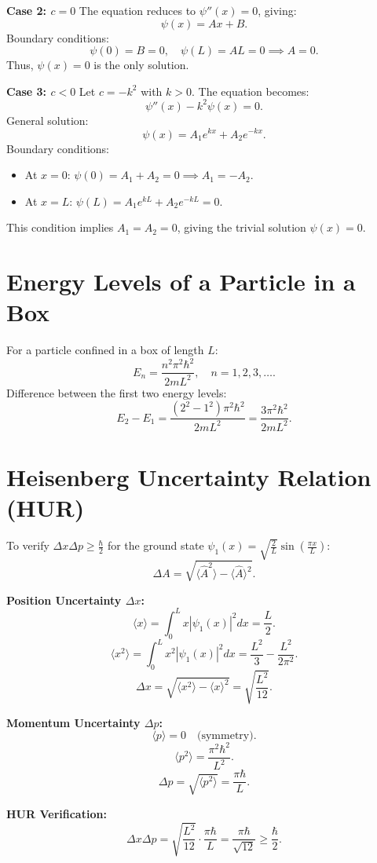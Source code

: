 \documentclass[a4paper,12pt]{article}
\begin{document}
\begin{multicols}{2}
\textbf{Case 2: $c = 0$}  
The equation reduces to $\psi''(x) = 0$, giving:
\[
\psi(x) = Ax + B.
\]
Boundary conditions:
\[
\psi(0) = B = 0, \quad \psi(L) = A L = 0 \implies A = 0.
\]
Thus, $\psi(x) = 0$ is the only solution.

\textbf{Case 3: $c < 0$}  
Let $c = -k^2$ with $k > 0$. The equation becomes:
\[
\psi''(x) - k^2\psi(x) = 0.
\]
General solution:
\[
\psi(x) = A_1e^{kx} + A_2e^{-kx}.
\]
Boundary conditions:
\begin{itemize}
    \item At $x=0$: $\psi(0) = A_1 + A_2 = 0 \implies A_1 = -A_2$.
    \item At $x=L$: $\psi(L) = A_1e^{kL} + A_2e^{-kL} = 0$.
\end{itemize}
This condition implies $A_1 = A_2 = 0$, giving the trivial solution $\psi(x) = 0$.

\section*{Energy Levels of a Particle in a Box}
For a particle confined in a box of length $L$:
\[
E_n = \frac{n^2\pi^2\hbar^2}{2mL^2}, \quad n = 1, 2, 3, \dots.
\]
Difference between the first two energy levels:
\[
E_2 - E_1 = \frac{(2^2 - 1^2)\pi^2\hbar^2}{2mL^2} = \frac{3\pi^2\hbar^2}{2mL^2}.
\]

\section*{Heisenberg Uncertainty Relation (HUR)}
To verify $\Delta x \Delta p \geq \frac{\hbar}{2}$ for the ground state $\psi_1(x) = \sqrt{\frac{2}{L}} \sin\left(\frac{\pi x}{L}\right)$:
\[
\Delta A = \sqrt{\langle \hat{A}^2 \rangle - \langle \hat{A} \rangle^2}.
\]

\textbf{Position Uncertainty $\Delta x$:}
\[
\langle x \rangle = \int_0^L x |\psi_1(x)|^2 dx = \frac{L}{2}.
\]
\[
\langle x^2 \rangle = \int_0^L x^2 |\psi_1(x)|^2 dx = \frac{L^2}{3} - \frac{L^2}{2\pi^2}.
\]
\[
\Delta x = \sqrt{\langle x^2 \rangle - \langle x \rangle^2} = \sqrt{\frac{L^2}{12}}.
\]

\textbf{Momentum Uncertainty $\Delta p$:}
\[
\langle p \rangle = 0 \quad \text{(symmetry)}.
\]
\[
\langle p^2 \rangle = \frac{\pi^2\hbar^2}{L^2}.
\]
\[
\Delta p = \sqrt{\langle p^2 \rangle} = \frac{\pi\hbar}{L}.
\]

\textbf{HUR Verification:}
\[
\Delta x \Delta p = \sqrt{\frac{L^2}{12}} \cdot \frac{\pi\hbar}{L} = \frac{\pi\hbar}{\sqrt{12}} \geq \frac{\hbar}{2}.
\]

\end{multicols}
\end{document}
